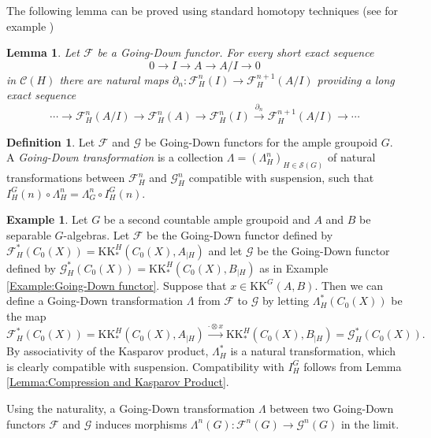 \documentclass[reqno,oneside,a4paper,11pt]{amsart}
\theoremstyle{theorem}
\newtheorem{lemma}[satz]{Lemma}
\theoremstyle{definition}
\newtheorem{defi}[satz]{Definition}
\newtheorem{ex}[satz]{Example}
\begin{document}
	The following lemma can be proved using standard homotopy techniques (see for example \cite[§21.4]{MR1656031})
	\begin{lemma} Let $\mathcal{F}$ be a Going-Down functor.
		For every short exact sequence $$0\longrightarrow I\longrightarrow A\longrightarrow A/I\longrightarrow 0$$ in $\mathcal{C}(H)$ there are natural maps $\partial_n:\mathcal{F}_H^n(I)\rightarrow\mathcal{F}_H^{n+1}(A/I)$ providing a long exact sequence
		$$\cdots\longrightarrow \mathcal{F}_H^n(A/I)\longrightarrow \mathcal{F}_H^{n}(A)\longrightarrow\mathcal{F}_H^n(I)\stackrel{\partial_n}{\longrightarrow}\mathcal{F}_H^{n+1}(A/I)\longrightarrow\cdots$$
	\end{lemma}
	\begin{defi}
		Let $\mathcal{F}$ and $\mathcal{G}$ be Going-Down functors for the ample groupoid $G$. A \textit{Going-Down transformation} is a collection $\Lambda=(\Lambda_H^n)_{H\in \mathcal{S}(G)}$ of natural transformations between $\mathcal{F}_H^n$ and $\mathcal{G}_H^n$ compatible with suspension, such that
		$I_H^G(n)\circ \Lambda_H^n=\Lambda_G^n\circ I_H^G(n)$.
	\end{defi}
	\begin{ex}
		Let $G$ be a second countable ample groupoid and $A$ and $B$ be separable $G$-algebras. Let $\mathcal{F}$ be the Going-Down functor defined by $\mathcal{F}_H^*(C_0(X))=\mathrm{KK}^H_*(C_0(X),A_{\mid H})$ and let $\mathcal{G}$ be the Going-Down functor defined by $\mathcal{G}_H^*(C_0(X))=\mathrm{KK}^H_*(C_0(X),B_{\mid H})$ as in Example \ref{Example:Going-Down functor}. Suppose that $x\in \mathrm{KK}^G(A,B)$. Then we can define a Going-Down transformation
		$\Lambda$ from $\mathcal{F}$ to $\mathcal{G}$ by letting $\Lambda_H^*(C_0(X))$ be the map $$\mathcal{F}_H^*(C_0(X))=\mathrm{KK}^H_*(C_0(X),A_{\mid H})\stackrel{\cdot \otimes x}{\rightarrow} \mathrm{KK}^H_*(C_0(X),B_{\mid H})=\mathcal{G}_H^*(C_0(X)).$$
		By associativity of the Kasparov product, $\Lambda_H^*$ is a natural transformation, which is clearly compatible with suspension. Compatibility with $I_H^G$ follows from Lemma \ref{Lemma:Compression and Kasparov Product}.	
	\end{ex}
	Using the naturality, a Going-Down transformation $\Lambda$ between two Going-Down functors $\mathcal{F}$ and $\mathcal{G}$ induces morphisms $\Lambda^n(G):\mathcal{F}^n(G)\rightarrow\mathcal{G}^n(G)$ in the limit.
	
\end{document}

